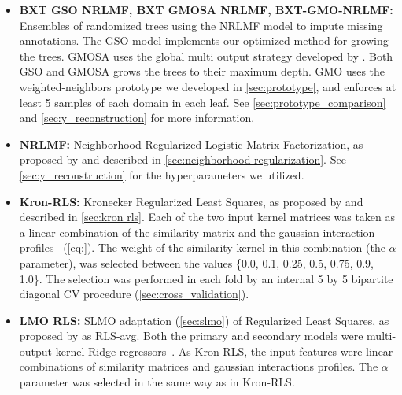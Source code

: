 \begin{itemize}
    \item \textbf{BXT GSO NRLMF, BXT GMOSA NRLMF, BXT-GMO-NRLMF:} Ensembles of randomized trees using the NRLMF model to impute missing annotations. The GSO model implements our optimized method for growing the trees. GMOSA uses the global multi output strategy developed by \cite{pliakos2018global}. Both GSO and GMOSA grows the trees to their maximum depth. GMO uses the weighted-neighbors prototype we developed in \autoref{sec:prototype}, and enforces at least 5 samples of each domain in each leaf. See \autoref{sec:prototype_comparison} and \autoref{sec:y_reconstruction} for more information.

    \item \textbf{NRLMF:} Neighborhood-Regularized Logistic Matrix Factorization, as proposed by \cite{liu2016neighborhood} and described in \autoref{sec:neighborhood regularization}. See \autoref{sec:y_reconstruction} for the hyperparameters we utilized.

    \item \textbf{Kron-RLS:} Kronecker Regularized Least Squares, as proposed by \cite{vanlaarhoven2011gaussian} and described in \autoref{sec:kron rls}.
    Each of the two input kernel matrices was taken as a linear combination of the similarity matrix and the gaussian interaction profiles~\cite{vanlaarhoven2011gaussian} (\autoref{eq:}).
    The weight of the similarity kernel in this combination (the $\alpha$ parameter), was selected between the values \{0.0, 0.1, 0.25, 0.5, 0.75, 0.9, 1.0\}.
    The selection was performed in each fold by an internal 5 by 5 bipartite diagonal CV procedure (\autoref{sec:cross_validation}).

    \item \textbf{LMO RLS:} SLMO adaptation (\autoref{sec:slmo}) of Regularized Least Squares, as proposed by \cite{vanlaarhoven2011gaussian} as RLS-avg. Both the primary and secondary models were multi-output kernel Ridge regressors~\cite{}. 
    As Kron-RLS, the input features were linear combinations of similarity matrices and gaussian interactions profiles. The $\alpha$ parameter was selected in the same way as in Kron-RLS.


\end{itemize}
